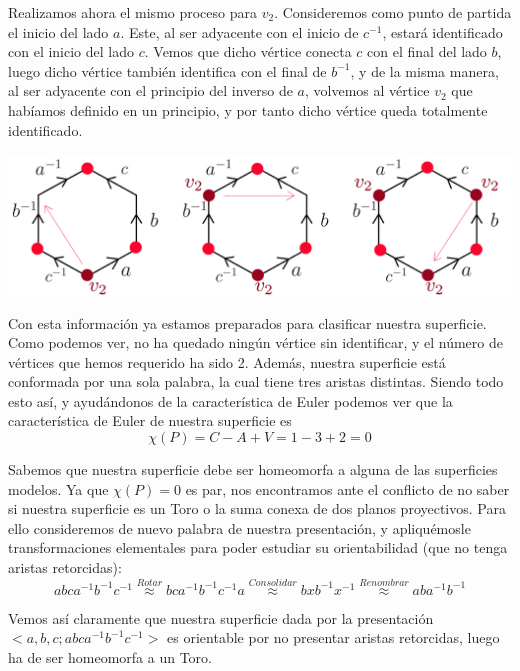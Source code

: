 \documentclass[fleqn]{article}
\begin{document}
    Realizamos ahora el mismo proceso para $v_2$. Consideremos como punto de partida el inicio del lado $a$. Este, al ser adyacente con el inicio 
    de $c^{-1}$, estará identificado con el inicio del lado $c$. Vemos que dicho vértice conecta $c$ con el final del lado $b$, luego dicho vértice 
    también identifica con el final de $b^{-1}$, y de la misma manera, al ser adyacente con el principio del inverso de $a$, volvemos al vértice $v_2$
    que habíamos definido en un principio, y por tanto dicho vértice queda totalmente identificado. 
    
    \begin{center}
        \noindent
        \includegraphics[width=1\linewidth]{v2.png}    
    \end{center}

    Con esta información ya estamos preparados para clasificar nuestra superficie. Como podemos ver, no ha quedado ningún vértice sin identificar, y 
    el número de vértices que hemos requerido ha sido 2. Además, nuestra superficie está conformada por una sola palabra, la cual tiene tres aristas
    distintas. Siendo todo esto así, y ayudándonos de la característica de Euler podemos ver que la característica de Euler de nuestra superficie es 
    $$\chi(P) = C - A + V = 1 - 3 + 2 = 0 $$

    Sabemos que nuestra superficie debe ser homeomorfa a alguna de las superficies modelos. Ya que $\chi(P) = 0$ es par, nos encontramos ante el conflicto
    de no saber si nuestra superficie es un Toro o la suma conexa de dos planos proyectivos. Para ello consideremos de nuevo palabra de nuestra presentación,
    y apliquémosle transformaciones elementales para poder estudiar su orientabilidad (que no tenga aristas retorcidas):
    $$abca^{-1}b^{-1}c^{-1} \overset{Rotar}{\approx} bca^{-1}b^{-1}c^{-1}a \overset{Consolidar}{\approx} bxb^{-1}x^{-1} \overset{Renombrar}{\approx} aba^{-1}b^{-1}$$

    Vemos así claramente que nuestra superficie dada por la presentación $<a,b,c; abca^{-1}b^{-1}c^{-1}>$ es orientable por no presentar aristas retorcidas, 
    luego ha de ser homeomorfa a un Toro.
\end{document}
